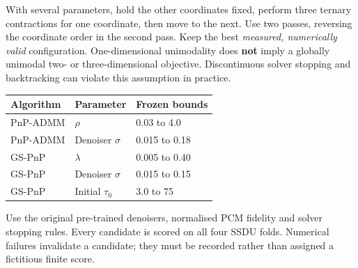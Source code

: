 \documentclass[10pt,a4paper]{article}
\begin{document}
With several parameters, hold the other coordinates fixed,
perform three ternary contractions for one coordinate,
then move to the next. Use two passes, reversing the
coordinate order in the second pass. Keep the best
\emph{measured, numerically valid} configuration.
One-dimensional unimodality does \textbf{not} imply a globally
unimodal two- or three-dimensional objective.
Discontinuous solver stopping and backtracking can violate
this assumption in practice.

\begin{center}
\begin{tabular}{@{}lll@{}}
\toprule
Algorithm & Parameter & Frozen bounds\\
\midrule
PnP-ADMM & $\rho$ & 0.03 to 4.0\\
PnP-ADMM & Denoiser $\sigma$ & 0.015 to 0.18\\
GS-PnP & $\lambda$ & 0.005 to 0.40\\
GS-PnP & Denoiser $\sigma$ & 0.015 to 0.15\\
GS-PnP & Initial $\tau_0$ & 3.0 to 75\\
\bottomrule
\end{tabular}
\end{center}

Use the original pre-trained denoisers, normalised PCM
fidelity and solver stopping rules.
Every candidate is scored on all four SSDU folds.
Numerical failures invalidate a candidate; they must be
recorded rather than assigned a fictitious finite score.
\end{document}

